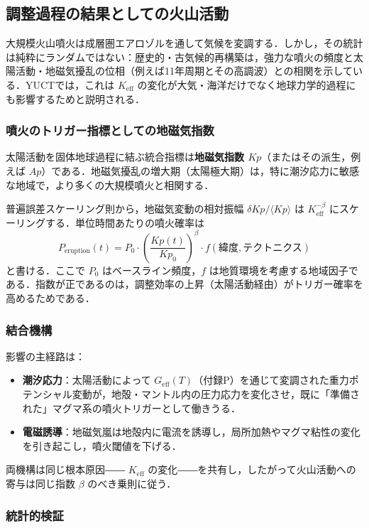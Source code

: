 \documentclass[11pt,a4paper]{article}
\newcommand{\Keff}{K_{\mathrm{eff}}}
\begin{document}
	\subsection{調整過程の結果としての火山活動}
	
	大規模火山噴火は成層圏エアロゾルを通して気候を変調する．しかし，その統計は純粋にランダムではない：歴史的・古気候的再構築は，強力な噴火の頻度と太陽活動・地磁気擾乱の位相（例えば11年周期とその高調波）との相関を示している．YUCTでは，これは $\Keff$ の変化が大気・海洋だけでなく地球力学的過程にも影響するためと説明される．
	
	\subsubsection{噴火のトリガー指標としての地磁気指数}
	
	太陽活動を固体地球過程に結ぶ統合指標は\textbf{地磁気指数 $Kp$}（またはその派生，例えば $Ap$）である．地磁気擾乱の増大期（太陽極大期）は，特に潮汐応力に敏感な地域で，より多くの大規模噴火と相関する．
	
	普遍誤差スケーリング則から，地磁気変動の相対振幅 $\delta Kp / \langle Kp \rangle$ は $\Keff^{-\beta}$ にスケーリングする．単位時間あたりの噴火確率は
	\[
	P_{\text{eruption}}(t) = P_0 \cdot \left( \frac{Kp(t)}{Kp_0} \right)^{\beta} \cdot f(\text{緯度}, \text{テクトニクス})
	\]
	と書ける．ここで $P_0$ はベースライン頻度，$f$ は地質環境を考慮する地域因子である．指数が正であるのは，調整効率の上昇（太陽活動経由）がトリガー確率を高めるためである．
	
	\subsubsection{結合機構}
	
	影響の主経路は：
	\begin{itemize}
		\item \textbf{潮汐応力}：太陽活動によって $G_{\text{eff}}(T)$（付録P）を通じて変調された重力ポテンシャル変動が，地殻・マントル内の圧力応力を変化させ，既に「準備された」マグマ系の噴火トリガーとして働きうる．
		\item \textbf{電磁誘導}：地磁気嵐は地殻内に電流を誘導し，局所加熱やマグマ粘性の変化を引き起こし，噴火閾値を下げる．
	\end{itemize}
	両機構は同じ根本原因―― $\Keff$ の変化――を共有し，したがって火山活動への寄与は同じ指数 $\beta$ のべき乗則に従う．
	
	\subsubsection{統計的検証}
	
\end{document}
